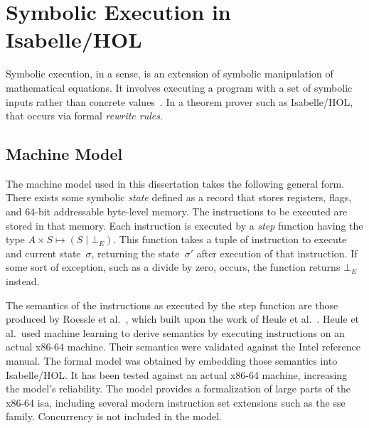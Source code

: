 \chapter{Symbolic Execution in Isabelle/HOL}\label{ch:symbolic_execution}
Symbolic execution, in a sense,
is an extension of symbolic manipulation of mathematical equations.
It involves executing a program with a set of symbolic inputs
rather than concrete values~\citep{king1976symbolic}.
In a theorem prover such as Isabelle/HOL,
that occurs via formal \emph{rewrite rules}.


\section{Machine Model}
The machine model used in this dissertation takes the following general form.
There exists some symbolic \emph{state} defined as a record
that stores registers, flags, and 64-bit addressable byte-level memory.
The instructions to be executed are stored in that memory.
Each instruction is executed by a \emph{step} function having the type
$A\times S\mapsto(S\mid\bot_E)$.%
%
%
This function takes a tuple of instruction to execute and current state~$\sigma$,
returning the state~$\sigma'$ after execution of that instruction.
If some sort of exception, such as a divide by zero, occurs,
the function returns $\bot_E$ instead.

The semantics of the instructions as executed by the step function
are those produced by Roessle et al.~\citep{roessle2019},
which built upon the work of Heule et al.~\citep{heule2016}.
Heule et al.\ used machine learning to derive semantics
by executing instructions on an actual x86-64 machine.
Their semantics were validated against the Intel reference manual.
The formal model was obtained by embedding those semantics into Isabelle/HOL.
It has been tested against an actual x86-64 machine, increasing the model's reliability.
The model provides a formalization of large parts of the x86-64 \ac{isa},
including several modern instruction set extensions such as the \ac{sse} family.
Concurrency is not included in the model.

